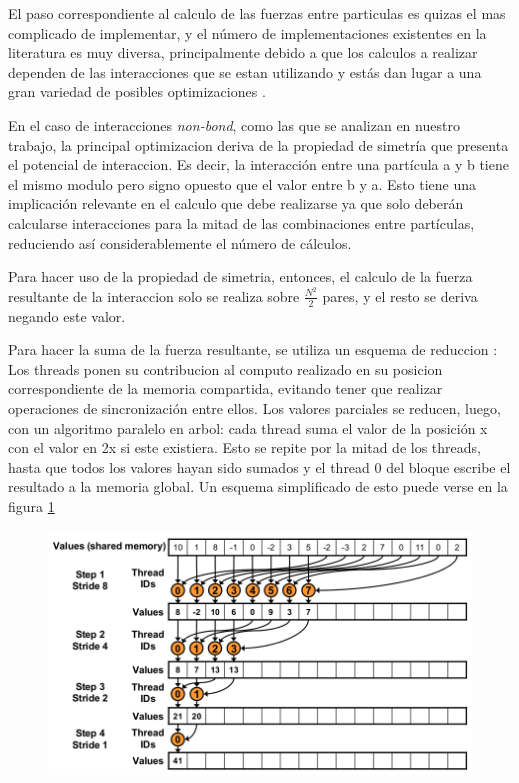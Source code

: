 El paso correspondiente al calculo de las fuerzas entre particulas es quizas el mas complicado de implementar, y el número de implementaciones existentes en la literatura es muy diversa, 
principalmente debido a que los calculos a realizar dependen de las interacciones que se estan utilizando y estás dan lugar a una gran variedad de posibles optimizaciones \cite{friedrichs2009accelerating}\cite{gotz2012routine}\cite{salomon2013routine}.


En el caso de interacciones \textit{non-bond}, como las que se analizan en nuestro trabajo, la principal optimizacion deriva de la propiedad de simetría que presenta el potencial de interaccion.
Es decir, la interacción entre una partícula a y b tiene el mismo modulo pero signo opuesto que el valor entre b y a. 
Esto tiene una implicación relevante en el calculo que debe realizarse ya que solo deberán calcularse interacciones para la mitad de las combinaciones entre partículas, reduciendo así considerablemente el número de cálculos.

Para hacer uso de la propiedad de simetria, entonces, el calculo de la fuerza resultante de la interaccion solo se realiza sobre $\frac{N^2}{2}$ pares, y el resto se deriva negando este valor.


Para hacer la suma de la fuerza resultante, se utiliza un esquema de reduccion \cite{cudaReductions}:
Los threads ponen su contribucion al computo realizado en su posicion correspondiente de la memoria compartida, evitando tener que realizar operaciones de sincronización entre ellos. Los valores parciales se reducen,
luego, con un algoritmo paralelo en arbol: cada thread suma el valor de la posición x con el valor en 2x si este existiera. Esto se repite por la mitad de los threads, hasta que todos los valores hayan sido sumados 
y el thread 0 del bloque escribe el resultado a la memoria global.
Un esquema simplificado de esto puede verse en la figura \ref{reduction}
\begin{figure}[htbp]
   \centering
   \includegraphics[width=\plotwidth]{img/md/reductions.png}
   \caption{}
   \label{reduction}
\end{figure}

